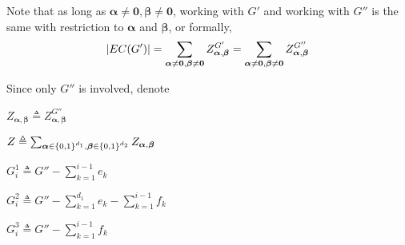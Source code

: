 	Note that as long as $\boldsymbol\alpha \neq \mathbf{0} , \boldsymbol\beta \neq \mathbf{0}$, working with $G'$ and working with $G''$ is the same with restriction to $\boldsymbol\alpha$ and $\boldsymbol\beta$, or formally,
\[\left\vert EC(G')\right\vert = \sum_{\boldsymbol\alpha \neq \mathbf{0}, \boldsymbol\beta \neq \mathbf{0}} Z_{\boldsymbol\alpha, \boldsymbol\beta}^{G'} = \sum_{\boldsymbol\alpha \neq \mathbf{0}, \boldsymbol\beta \neq \mathbf{0}} Z_{\boldsymbol\alpha, \boldsymbol\beta}^{G''}\]

Since only $G''$ is involved, denote

$Z_{\boldsymbol\alpha, \boldsymbol\beta} \triangleq Z_{\boldsymbol\alpha, \boldsymbol\beta}^{G''}$

$Z \triangleq \sum_{\boldsymbol\alpha \in \left\{0,1\right\}^{d_1} , \boldsymbol\beta \in \left\{0,1\right\}^{d_2}} Z_{\boldsymbol\alpha, \boldsymbol\beta}$


    $G_i^1 \triangleq G'' - \sum_{k=1}^{i-1} e_k$

    $G_i^2 \triangleq G'' - \sum_{k=1}^{d_1}e_k - \sum_{k=1}^{i-1} f_k$

    $G_i^3 \triangleq G'' - \sum_{k=1}^{i-1} f_k$





